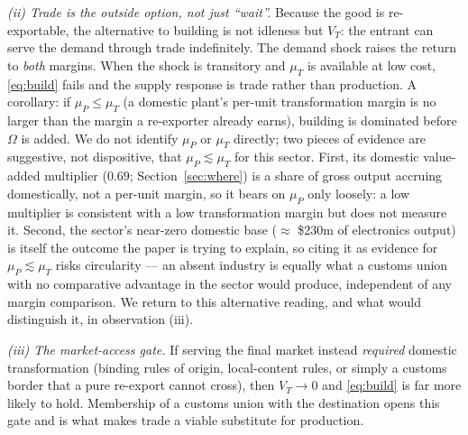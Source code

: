\documentclass[12pt]{article}
\begin{document}
\emph{(ii) Trade is the outside option, not just ``wait''.} Because the good is re-exportable,
the alternative to building is not idleness but $V_T$: the entrant can serve the demand
through trade indefinitely. The demand shock raises the return to \emph{both} margins. When
the shock is transitory and $\mu_T$ is available at low cost, \eqref{eq:build} fails and the
supply response is trade rather than production. A corollary: if $\mu_P \le \mu_T$ (a domestic
plant's per-unit transformation margin is no larger than the margin a re-exporter already
earns), building is dominated before $\Omega$ is added. We do not identify $\mu_P$ or $\mu_T$
directly; two pieces of evidence are suggestive, not dispositive, that $\mu_P \lesssim \mu_T$
for this sector. First, its domestic value-added multiplier ($0.69$; Section~\ref{sec:where})
is a share of gross output accruing domestically, not a per-unit margin, so it bears on
$\mu_P$ only loosely: a low multiplier is consistent with a low transformation margin but does
not measure it. Second, the sector's near-zero domestic base ($\approx$ \$230m of electronics
output) is itself the outcome the paper is trying to explain, so citing it as evidence for
$\mu_P \lesssim \mu_T$ risks circularity --- an absent industry is equally what a customs union
with no comparative advantage in the sector would produce, independent of any margin
comparison. We return to this alternative reading, and what would distinguish it, in
observation (iii).

\emph{(iii) The market-access gate.} If serving the final market instead \emph{required}
domestic transformation (binding rules of origin, local-content rules, or simply a customs
border that a pure re-export cannot cross), then $V_T \to 0$ and \eqref{eq:build} is far more
likely to hold. Membership of a customs union with the destination opens this gate and is
what makes trade a viable substitute for production.
\end{document}
